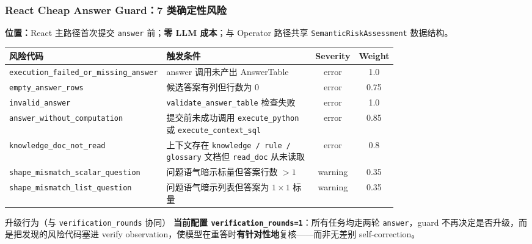 \documentclass[11pt, aspectratio=169]{beamer}
\begin{document}
\begin{frame}
\frametitle{React Cheap Answer Guard：7 类确定性风险}

\vspace{-0.2em}
\scriptsize
\textbf{位置：}React 主路径首次提交 \texttt{answer} 前；\textbf{零 LLM 成本}；与 Operator 路径共享 \texttt{SemanticRiskAssessment} 数据结构。

\vspace{0.3em}
\begin{center}
\begin{tabular}{p{0.32\linewidth}p{0.42\linewidth}cc}
\toprule
\textbf{风险代码} & \textbf{触发条件} & \textbf{Severity} & \textbf{Weight} \\
\midrule
\texttt{execution\_failed\_or\_missing\_answer} & answer 调用未产出 AnswerTable & error & 1.0 \\
\texttt{empty\_answer\_rows} & 候选答案有列但行数为 0 & error & 0.75 \\
\texttt{invalid\_answer} & \texttt{validate\_answer\_table} 检查失败 & error & 1.0 \\
\texttt{answer\_without\_computation} & 提交前未成功调用 \texttt{execute\_python} 或 \texttt{execute\_context\_sql} & error & 0.85 \\
\texttt{knowledge\_doc\_not\_read} & 上下文存在 \texttt{knowledge / rule / glossary} 文档但 \texttt{read\_doc} 从未读取 & error & 0.8 \\
\texttt{shape\_mismatch\_scalar\_question} & 问题语气暗示标量但答案行数 $> 1$ & warning & 0.35 \\
\texttt{shape\_mismatch\_list\_question} & 问题语气暗示列表但答案为 $1\times 1$ 标量 & warning & 0.35 \\
\bottomrule
\end{tabular}
\end{center}

\vspace{0.4em}
\begin{block}{升级行为（与 \texttt{verification\_rounds} 协同）}
\scriptsize
\textbf{当前配置 \texttt{verification\_rounds=1}}：所有任务均走两轮 \texttt{answer}，guard 不再决定是否升级，而是把发现的风险代码塞进 verify observation，使模型在重答时\textbf{有针对性地}复核——而非无差别 self-correction。
\end{block}

\end{frame}
\end{document}
